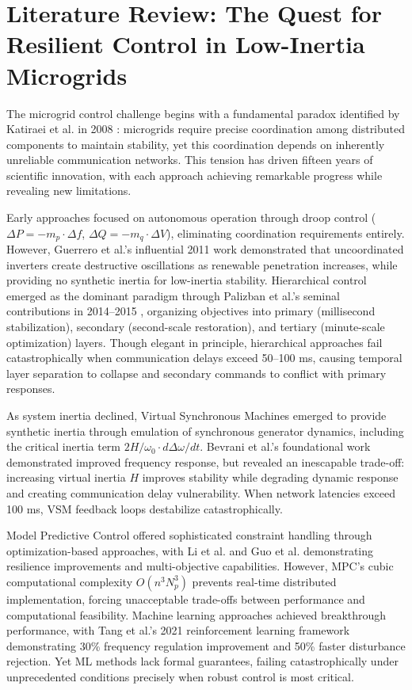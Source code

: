 \documentclass[12pt]{article}
\begin{document}
\section{Literature Review: The Quest for Resilient Control in Low-Inertia Microgrids}

The microgrid control challenge begins with a fundamental paradox identified by Katiraei et al. in 2008 \cite{katiraei2008}: microgrids require precise coordination among distributed components to maintain stability, yet this coordination depends on inherently unreliable communication networks. This tension has driven fifteen years of scientific innovation, with each approach achieving remarkable progress while revealing new limitations.

Early approaches focused on autonomous operation through droop control ($\Delta P = -m_p \cdot \Delta f$, $\Delta Q = -m_q \cdot \Delta V$), eliminating coordination requirements entirely. However, Guerrero et al.'s influential 2011 work \cite{guerrero2011} demonstrated that uncoordinated inverters create destructive oscillations as renewable penetration increases, while providing no synthetic inertia for low-inertia stability. Hierarchical control emerged as the dominant paradigm through Palizban et al.'s seminal contributions in 2014--2015 \cite{palizban2014,palizban2015}, organizing objectives into primary (millisecond stabilization), secondary (second-scale restoration), and tertiary (minute-scale optimization) layers. Though elegant in principle, hierarchical approaches fail catastrophically when communication delays exceed 50--100 ms, causing temporal layer separation to collapse and secondary commands to conflict with primary responses.

As system inertia declined, Virtual Synchronous Machines emerged to provide synthetic inertia through emulation of synchronous generator dynamics, including the critical inertia term $2H/\omega_0 \cdot d\Delta\omega/dt$. Bevrani et al.'s foundational work \cite{bevrani2014} demonstrated improved frequency response, but revealed an inescapable trade-off: increasing virtual inertia $H$ improves stability while degrading dynamic response and creating communication delay vulnerability. When network latencies exceed 100 ms, VSM feedback loops destabilize catastrophically.

Model Predictive Control offered sophisticated constraint handling through optimization-based approaches, with Li et al. \cite{li2017} and Guo et al. \cite{guo2021} demonstrating resilience improvements and multi-objective capabilities. However, MPC's cubic computational complexity $O(n^3 N_p^3)$ prevents real-time distributed implementation, forcing unacceptable trade-offs between performance and computational feasibility. Machine learning approaches achieved breakthrough performance, with Tang et al.'s 2021 reinforcement learning framework \cite{tang2021} demonstrating 30\% frequency regulation improvement and 50\% faster disturbance rejection. Yet ML methods lack formal guarantees, failing catastrophically under unprecedented conditions precisely when robust control is most critical.
\end{document}
